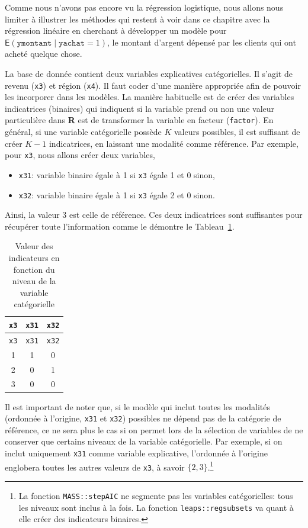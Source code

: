 \documentclass[
  11pt,
  letterpaper,
]{scrbook}
\providecommand{\tightlist}{%
  \setlength{\itemsep}{0pt}\setlength{\parskip}{0pt}}\usepackage{longtable,booktabs,array}
\theoremstyle{definition}
\theoremstyle{remark}
\begin{document}
Comme nous n'avons pas encore vu la régression logistique, nous allons
nous limiter à illustrer les méthodes qui restent à voir dans ce
chapitre avec la régression linéaire en cherchant à développer un modèle
pour \(\mathsf{E}(\texttt{ymontant} \mid \texttt{yachat}=1)\), le
montant d'argent dépensé par les clients qui ont acheté quelque chose.

La base de donnée contient deux variables explicatives catégorielles. Il
s'agit de revenu (\texttt{x3}) et région (\texttt{x4}). Il faut coder
d'une manière appropriée afin de pouvoir les incorporer dans les
modèles. La manière habituelle est de créer des variables indicatrices
(binaires) qui indiquent si la variable prend ou non une valeur
particulière dans \textbf{R} est de transformer la variable en facteur
(\texttt{factor}). En général, si une variable catégorielle possède
\(K\) valeurs possibles, il est suffisant de créer \(K-1\) indicatrices,
en laissant une modalité comme référence. Par exemple, pour \texttt{x3},
nous allons créer deux variables,

\begin{itemize}
\tightlist
\item
  \texttt{x31}: variable binaire égale à 1 si \texttt{x3} égale 1 et 0
  sinon,
\item
  \texttt{x32}: variable binaire égale à 1 si \texttt{x3} égale 2 et 0
  sinon.
\end{itemize}

Ainsi, la valeur 3 est celle de référence. Ces deux indicatrices sont
suffisantes pour récupérer toute l'information comme le démontre le
Tableau~\ref{tbl-02-dummy}.

\hypertarget{tbl-02-dummy}{}
\begin{longtable}[]{@{}ccc@{}}
\caption{\label{tbl-02-dummy}Valeur des indicateurs en fonction du
niveau de la variable catégorielle}\tabularnewline
\toprule()
\texttt{x3} & \texttt{x31} & \texttt{x32} \\
\midrule()
\endfirsthead
\toprule()
\texttt{x3} & \texttt{x31} & \texttt{x32} \\
\midrule()
\endhead
1 & 1 & 0 \\
2 & 0 & 1 \\
3 & 0 & 0 \\
\bottomrule()
\end{longtable}

Il est important de noter que, si le modèle qui inclut toutes les
modalités (ordonnée à l'origine, \texttt{x31} et \texttt{x32}) possibles
ne dépend pas de la catégorie de référence, ce ne sera plus le cas si on
permet lors de la sélection de variables de ne conserver que certains
niveaux de la variable catégorielle. Par exemple, si on inclut
uniquement \texttt{x31} comme variable explicative, l'ordonnée à
l'origine englobera toutes les autres valeurs de \texttt{x3}, à savoir
\(\{2, 3\}\).\footnote{La fonction \texttt{MASS::stepAIC} ne segmente
  pas les variables catégorielles: tous les niveaux sont inclus à la
  fois. La fonction \texttt{leaps::regsubsets} va quant à elle créer des
  indicateurs binaires.}
\end{document}
